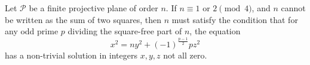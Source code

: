 Let $\mathcal{P}$ be a finite projective plane of order $n$. If $n \equiv 1$ or $2 \pmod{4}$, and $n$ cannot be written as the sum of two squares, then $n$ must satisfy the condition that for any odd prime $p$ dividing the square-free part of $n$, the equation
$$x^2 = n y^2 + (-1)^{\frac{p-1}{2}} p z^2$$
has a non-trivial solution in integers $x, y, z$ not all zero.
